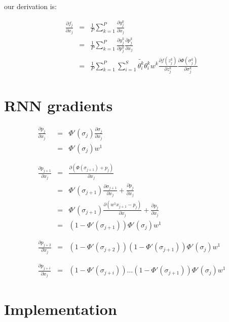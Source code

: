 \documentclass[11pt]{article}
\begin{document}
our derivation is:

\begin{eqnarray}
\frac{\partial f_{j}}{\partial x_{j}} &=& \frac{1}{P} \sum_{k=1}^{P} \frac{\partial {{y_{j}^{k}}}}{\partial {{x_{j}}}} \\
               &=& \frac{1}{P} \sum_{k=1}^{P} \frac{\partial {y_{j}^{k}}}{\partial {p_{j}^{k}}} \frac{\partial {p_{j}^{k}}}{\partial {x_{j}}} \\
               &=& \frac{1}{P} \sum_{k=1}^{P}  \sum_{i=1}^{S} \tilde{\theta_{i}^{k}} \theta_{i}^{k} w^{k} \frac{\partial f(z_{j}^{k})}{\partial z_{j}^{k}} \frac{\partial{\Phi(\sigma_{j}^{k})}}{\partial{\sigma_{j}^{k}}}
\end{eqnarray}

\section{RNN gradients}
\label{sec:orgeae9d28}
\begin{eqnarray}
\frac{\partial p_j}{\partial x_j} &=& \Phi'(\sigma_j) \frac{\partial \sigma_j}{\partial x_j} \\
&=& \Phi'(\sigma_j) w^{1} \\
\\
\\
\frac{\partial p_{j+1}}{\partial x_j} &=& \frac{\partial (\Phi(\sigma_{j+1}) + p_j)}{\partial x_j} \\
&=& \Phi'(\sigma_{j+1}) \frac{\partial \sigma_{j+1}}{\partial x_j} + \frac{\partial p_j}{\partial x_j} \\
&=& \Phi'(\sigma_{j+1}) \frac{\partial (w^{1} x_{j+1} - p_{j})}{\partial x_j} + \frac{\partial p_j}{\partial x_j} \\
&=& (1-\Phi'(\sigma_{j+1})) \Phi'(\sigma_j) w^{1} \\
\\
\\
\frac{\partial p_{j+2}}{\partial x_j} &=&  (1-\Phi'(\sigma_{j+2})) (1-\Phi'(\sigma_{j+1})) \Phi'(\sigma_j) w^{1} \\
\\
\\
\frac{\partial p_{j+i}}{\partial x_j} &=&  (1-\Phi'(\sigma_{j+i})) ... (1-\Phi'(\sigma_{j+1})) \Phi'(\sigma_j) w^{1}
\end{eqnarray}

\section{Implementation}
\label{sec:orgf94c44f}
\end{document}
